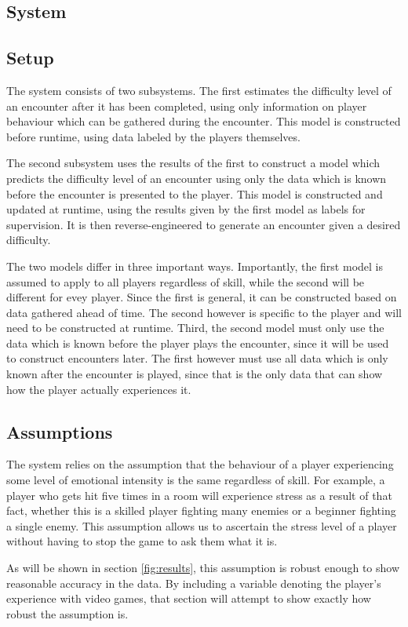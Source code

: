 \documentclass[a4paper]{article}
\begin{document}
\begin{multicols*}{2}
\section{System}
\subsection{Setup}
The system consists of two subsystems. The first estimates the difficulty level of an encounter after it has been completed, using only information on player behaviour which can be gathered during the encounter. This model is constructed before runtime, using data labeled by the players themselves.

The second subsystem uses the results of the first to construct a model which predicts the difficulty level of an encounter using only the data which is known before the encounter is presented to the player. This model is constructed and updated at runtime, using the results given by the first model as labels for supervision. It is then reverse-engineered to generate an encounter given a desired difficulty.

The two models differ in three important ways. Importantly, the first model is assumed to apply to all players regardless of skill, while the second will be different for evey player. Since the first is general, it can be constructed based on data gathered ahead of time. The second however is specific to the player and will need to be constructed at runtime. Third, the second model must only use the data which is known before the player plays the encounter, since it will be used to construct encounters later. The first however must use all data which is only known after the encounter is played, since that is the only data that can show how the player actually experiences it.

\subsection{Assumptions}
The system relies on the assumption that the behaviour of a player experiencing some level of emotional intensity is the same regardless of skill. For example, a player who gets hit five times in a room will experience stress as a result of that fact, whether this is a skilled player fighting many enemies or a beginner fighting a single enemy. This assumption allows us to ascertain the stress level of a player without having to stop the game to ask them what it is.

As will be shown in section \ref{fig:results}, this assumption is robust enough to show reasonable accuracy in the data. By including a variable denoting the player's experience with video games, that section will attempt to show exactly how robust the assumption is.


\end{multicols*}
\end{document}
